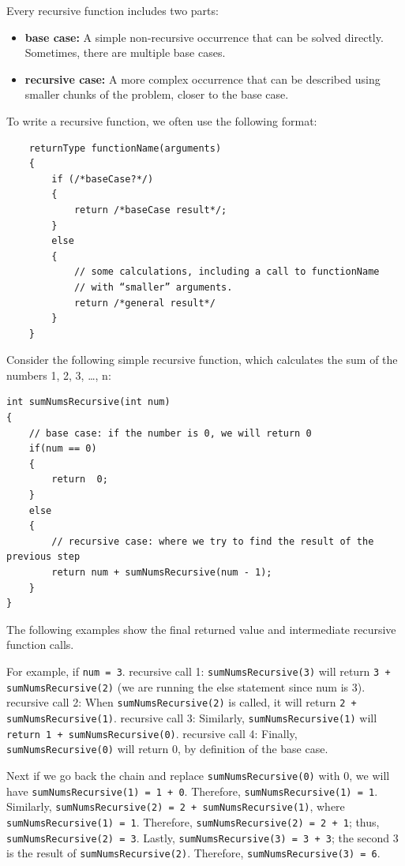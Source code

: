 Every recursive function includes two parts:

\begin{itemize}
    \item \textbf{base case:} A simple non-recursive occurrence that can be solved directly. Sometimes, there are multiple base cases.
    \item \textbf{recursive case:} A more complex occurrence that can be described using smaller chunks of the problem, closer to the base case.
\end{itemize}
    
To write a recursive function, we often use the following format:

\begin{verbatim}
    returnType functionName(arguments)
    {
        if (/*baseCase?*/)
        {
            return /*baseCase result*/;
        }
        else
        {
            // some calculations, including a call to functionName
            // with “smaller” arguments.
            return /*general result*/
        }
    }
\end{verbatim}

Consider the following simple recursive function, which calculates the sum of the numbers 1, 2, 3, …, n:

\begin{verbatim}
int sumNumsRecursive(int num)
{
    // base case: if the number is 0, we will return 0
    if(num == 0)
    {
        return  0;
    }
    else
    {
        // recursive case: where we try to find the result of the previous step
        return num + sumNumsRecursive(num - 1);
    }
}
\end{verbatim}

The following examples show the final returned value and intermediate recursive function calls.

For example, if \texttt{num = 3}.
recursive call 1: \texttt{sumNumsRecursive(3)} will return \texttt{3 + sumNumsRecursive(2)} (we are running the else statement since num is 3).
recursive call 2: When \texttt{sumNumsRecursive(2)} is called, it will return \texttt{2 + sumNumsRecursive(1)}.
recursive call 3: Similarly, \texttt{sumNumsRecursive(1)} will \texttt{return 1 + sumNumsRecursive(0)}.
recursive call 4: Finally, \texttt{sumNumsRecursive(0)} will return 0, by definition of the base case.

Next if we go back the chain and replace \texttt{sumNumsRecursive(0)} with 0, we will have \texttt{sumNumsRecursive(1) = 1 + 0}. Therefore, \texttt{sumNumsRecursive(1) = 1}.
Similarly, \texttt{sumNumsRecursive(2) = 2 + sumNumsRecursive(1)}, where \texttt{sumNumsRecursive(1) = 1}. Therefore, \texttt{sumNumsRecursive(2) = 2 + 1}; thus, \texttt{sumNumsRecursive(2) = 3}.
Lastly, \texttt{sumNumsRecursive(3) = 3 + 3}; the second 3 is the result of \texttt{sumNumsRecursive(2)}. Therefore, \texttt{sumNumsRecursive(3) = 6}.

